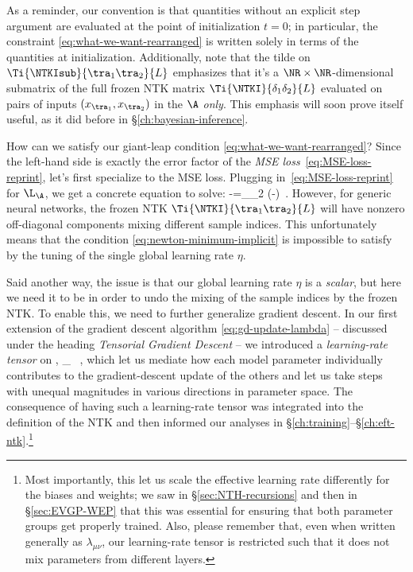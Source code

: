 As a reminder, our convention is that quantities without an explicit step argument are evaluated at the point of initialization $t=0$; in particular, the constraint \eqref{eq:what-we-want-rearranged} is written solely in terms of the quantities at initialization. Additionally, note that the tilde on $\Ti{\NTKIsub}{\tra_1 \tra_2}{L}$ emphasizes that it's a $\NR\times\NR$-dimensional submatrix of the full frozen NTK matrix $\Ti{\NTKI}{\delta_1 \delta_2}{L}$ evaluated on  pairs of inputs $(x_{\tra_1}, x_{\tra_2})$ in the  $\A$ \emph{only}. This emphasis will soon prove itself useful, as it did before in \S\ref{ch:bayesian-inference}.







How can we satisfy our giant-leap condition \eqref{eq:what-we-want-rearranged}? Since the left-hand side is exactly the error factor of the \emph{MSE loss}~\eqref{eq:MSE-loss-reprint}, let's first specialize to the MSE loss. Plugging in~\eqref{eq:MSE-loss-reprint} for $\L_{\A}$, we get a concrete equation to solve: 
\be\label{eq:newton-minimum-implicit}
-=\sum_{\tra_2 \in\A}\eta {}\le(-\ri) \,.
\ee
However, for generic neural networks, the frozen NTK $\Ti{\NTKI}{\tra_1 \tra_2}{L}$ will have nonzero off-diagonal components mixing different sample indices.
This unfortunately means that the condition \eqref{eq:newton-minimum-implicit} is impossible to satisfy by the tuning of the single global learning rate $\eta$.

Said another way, the issue is that our global learning rate $\eta$ is a \emph{scalar}, but here we need it to be  in order to undo the mixing of the sample indices by the frozen NTK.
To enable this, we need to further generalize gradient descent. In our first extension of the gradient descent algorithm \eqref{eq:gd-update-lambda} -- discussed under the heading \emph{Tensorial Gradient Descent} -- we introduced a \emph{learning-rate tensor} on ,
\be\label{eq:generalization-original}
\eta\to\eta\lambda_{\mu\nu} \, ,
\ee
which let us mediate how each model parameter individually contributes to the gradient-descent update of the others and let us take steps with unequal magnitudes in various directions in parameter space.  The consequence of having such a learning-rate tensor was integrated into the definition of the NTK and then informed our analyses in \S\ref{ch:training}--\S\ref{ch:eft-ntk}.\footnote{Most importantly, this let us scale the effective learning rate differently for the biases and weights; we saw in \S\ref{sec:NTH-recursions} and then in \S\ref{sec:EVGP-WEP} that this was essential for ensuring that both parameter groups get properly trained. Also, please remember that, even when written generally as $\lambda_{\mu\nu}$, our learning-rate tensor is restricted such that it does not mix parameters from different layers.}



